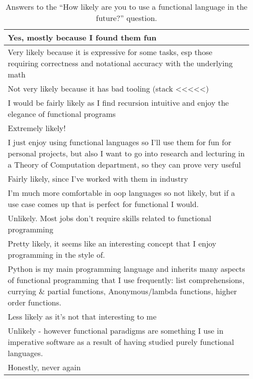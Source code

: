 \begin{table}[h]
    \centering
    \begin{tabular}{p{\linewidth}}\hline
        Yes, mostly because I found them fun\\\hline
        Very likely because it is expressive for some tasks, esp those requiring correctness and notational accuracy with the underlying math\\\hline
        Not very likely because it has bad tooling (stack <<<<<)\\\hline
        I would be fairly likely as I find recursion intuitive and enjoy the elegance of functional programs\\\hline
        Extremely likely!\\\hline
        I just enjoy using functional languages so I'll use them for fun for personal projects, but also I want to go into research and lecturing in a Theory of Computation department, so they can prove very useful\\\hline
        Fairly likely, since I've worked with them in industry\\\hline
        I’m much more comfortable in oop languages so not likely, but if a use case comes up that is perfect for functional I would.\\\hline
        Unlikely. Most jobs don’t require skills related to functional programming\\\hline
        Pretty likely, it seems like an interesting concept that I enjoy programming in the style of.\\\hline
        Python is my main programming language and inherits many aspects of functional programming that I use frequently: list comprehensions, currying \& partial functions, Anonymous/lambda functions, higher order functions.\\\hline
        Less likely as it's not that interesting to me\\\hline
        Unlikely - however functional paradigms are something I use in imperative software as a result of having studied purely functional languages.\\\hline
        Honestly, never again\\\hline
    \end{tabular}
    \caption{Answers to the ``How likely are you to use a functional language in the future?'' question.}
    \label{tab:future}
\end{table}